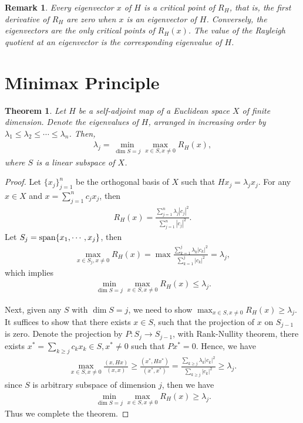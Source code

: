 \documentclass[11pt]{book}
\newtheorem{theorem}{Theorem}[section]
\newtheorem{remark}{Remark}[section]
\theoremstyle{definition}
\numberwithin{equation}{chapter}
\begin{document}
\begin{remark}
Every eigenvector $x$ of $H$ is a critical point of $R_H$, that is, the first derivative of $R_H$ are zero when $x$ is an eigenvector of $H$. Conversely, the eigenvectors are the only critical points of $R_H(x)$. The value of the Rayleigh quotient at an eigenvector is the corresponding eigenvalue of $H$.
\end{remark}

\medskip

\section{Minimax Principle}

\begin{theorem}\label{minimax_principle}
Let $H$ be a self-adjoint map of a Euclidean space $X$ of finite dimension. Denote the eigenvalues of $H$, arranged in increasing order by $\lambda_1 \leq \lambda_2 \leq \cdots \leq \lambda_n$. Then,
\begin{align*}
    \lambda_j = \min_{\dim S=j} \max_{x\in S, x\neq 0} R_H(x),
\end{align*}
where $S$ is a linear subspace of $X$.
\end{theorem}
\begin{proof}
Let $\{x_j\}^n_{j=1}$ be the orthogonal basis of $X$ such that $Hx_j = \lambda_j x_j$. For any $x\in X$ and $x = \sum^n_{j=1}c_j x_j$, then 
\begin{align*}
    R_H(x) = \frac{\sum^n_{j=1}\lambda_j |c_j|^2}{\sum^n_{j=1} |c_j|^2}.
\end{align*}
Let $S_j = {\rm span} \{x_1,\cdots,x_j\}$, then 
\begin{align*}
    \max_{x\in S_j, x\neq 0} R_H(x) = \max \frac{\sum^j_{k=1}\lambda_k |c_k|^2}{\sum^j_{k=1} |c_k|^2} = \lambda_j,
\end{align*}
which implies 
\begin{align*}
    \min_{\dim S=j} \max_{x\in S, x\neq 0} R_H(x) \leq \lambda_j.
\end{align*}

Next, given any $S$ with $\dim S = j$, we need to show $\max_{x\in S, x\neq 0} R_H(x) \geq \lambda_j$. It suffices to show that there exists $x\in S$, such that the projection of $x$ on $S_{j-1}$ is zero. Denote the projection by $P:S_j\to S_{j-1}$, with Rank-Nullity theorem, there exists $x^* = \sum_{k\geq j}c_k x_k \in S, x^*\neq 0$ such that $Px^* = 0$. Hence, we have
\begin{align*}
    \max_{x\in S, x\neq 0} \frac{(x,Hx)}{(x,x)} \geq \frac{(x^*, Hx^*)}{(x^*,x^*)} = \frac{\sum_{k\geq j}\lambda_k |c_k|^2}{\sum_{k\geq j} |c_k|^2} \geq \lambda_j.
\end{align*}
since $S$ is arbitrary subspace of dimension $j$, then we have
\begin{align*}
    \min_{\dim S=j} \max_{x\in S, x\neq 0} R_H(x) \geq \lambda_j.
\end{align*}
Thus we complete the theorem.
\end{proof}
\end{document}
